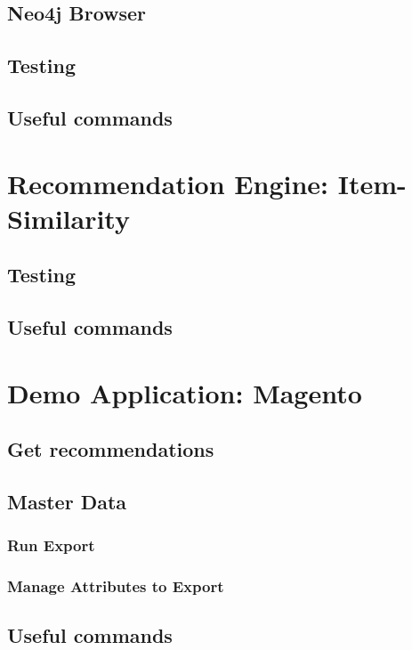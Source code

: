 \subsection{Neo4j Browser}

\subsection{Testing}

\subsection{Useful commands}

\section{Recommendation Engine: Item-Similarity}

\subsection{Testing}

\subsection{Useful commands}

\section{Demo Application: Magento}

\subsection{Get recommendations}

\subsection{Master Data}

\subsubsection{Run Export}

\subsubsection{Manage Attributes to Export}

\subsection{Useful commands}


